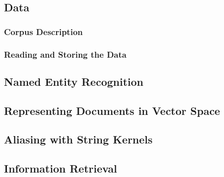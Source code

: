
\subsection{Data}\label{sec:data}
\subsubsection{Corpus Description}\label{sec:description_of_the_castro_archive}

\subsubsection{Reading and Storing the Data}\label{sec:reading_and_storing_the_data}

\subsection{Named Entity Recognition}\label{sec:stanford_named_entity_recognizer}


\subsection{Representing Documents in Vector Space}\label{sec:representing_documents_in_vector_space}


\subsection{Aliasing with String Kernels}\label{sec:aliasing}


\subsection{Information Retrieval}\label{sec:information_retrieval}

